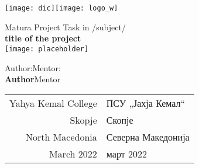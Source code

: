 \begin{titlepage}
	\begin{center}
	
		\texttt{[image: dic]}\hfill\texttt{[image: logo\_w]}
	    
    	\vfill
		
		\Large
		Matura Project Task in /subject/\\
		\vspace{0.5cm}
		\Huge
		\textbf{title of the project}\\
		\vspace{2cm}
		\texttt{[image: placeholder]}
		
		
		\vfill
		
		\normalsize
		Author:\hfill Mentor:\\
		\large
		\textbf{Author}\hfill Mentor
		
		\vspace{2cm}
		
		\normalsize
		\begin{tabular}{ r | l }
            Yahya Kemal College & ПСУ „Јахја Кемал“\\
            Skopje & Скопје\\
            North Macedonia & Северна Македонија\\
            March 2022 & март 2022
        \end{tabular}
            
	\end{center}
\end{titlepage}
